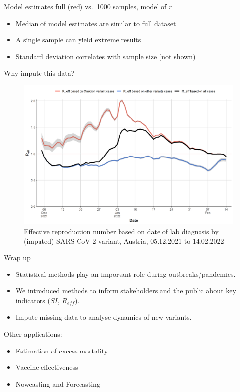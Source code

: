 \documentclass[
  ignorenonframetext,
  aspectratio=169,
]{beamer}
\newcommand{\mli}[1]{\mathit{#1}}%
\begin{document}
\begin{frame}{Model estimates full (red) vs.~1000 samples, model of
\(r\)}
\begin{minipage}{.60\textwidth}
\end{minipage}
\begin{minipage}{.30\textwidth}

\begin{itemize}
\item Median of model estimates are similar to full dataset
\item A single sample can yield extreme results
\item Standard deviation correlates with sample size (not shown)
\end{itemize}

\end{minipage}
\end{frame}

\begin{frame}{Why impute this data?}
\protect\hypertarget{why-impute-this-data}{}
\begin{figure}
  \centering
  \includegraphics[height=0.8\textheight,keepaspectratio]{img/new_voc_omi_full_reff.png}
  \caption{Effective reproduction number based on date of lab diagnosis by (imputed) SARS-CoV-2 variant, Austria, 05.12.2021 to 14.02.2022}
\end{figure}
\end{frame}

\begin{frame}{Wrap up}
\protect\hypertarget{wrap-up}{}
\begin{itemize}
\item Statistical methods play an important role during outbreaks/pandemics.
\item We introduced methods to inform stakeholders and the public about key indicators ($SI$, $R_\mli{eff}$).
\item Impute missing data to analyse dynamics of new variants.
\end{itemize}

Other applications:

\begin{itemize}
\item Estimation of excess mortality
\item Vaccine effectiveness
\item Nowcasting and Forecasting
\end{itemize}
\end{frame}
\end{document}
